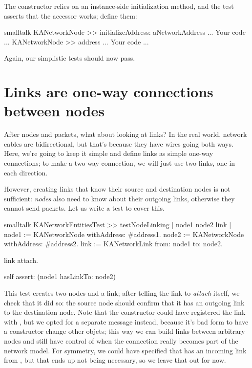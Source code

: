 \documentclass[10pt,twoside,english]{_support/latex/sbabook/sbabook}
\begin{document}
The constructor relies on an instance-side initialization method, and the test asserts that the  accessor works; define them:

\begin{displaycode}{smalltalk}
KANetworkNode >> initializeAddress: aNetworkAddress
	... Your code ...
KANetworkNode >> address
	... Your code ...
\end{displaycode}

Again, our simplistic tests should now pass.
\section{Links are one-way connections between nodes}
After nodes and packets, what about looking at links?
In the real world, network cables are bidirectional, but that's because they have wires going both ways.
Here, we're going to keep it simple and define links as simple one-way connections; to make a two-way connection, we will just use two links, one in each direction.

However, creating links that know their source and destination nodes is not sufficient: \textit{nodes} also need to know about their outgoing links, otherwise they cannot send packets. Let us write a test to cover this.

\begin{displaycode}{smalltalk}
KANetworkEntitiesTest >> testNodeLinking
    | node1 node2 link |
    node1 := KANetworkNode withAddress: #address1.
    node2 := KANetworkNode withAddress: #address2.
    link := KANetworkLink from: node1 to: node2.

    link attach.

    self assert: (node1 hasLinkTo: node2)
\end{displaycode}

This test creates two nodes and a link; after telling the link to \textit{attach} itself, we check that it did so: the source node should confirm that it has an outgoing link to the destination node.
Note that the constructor could have registered the link with , but we opted for a separate message  instead, because it's bad form to have a constructor change other objets; this way we can build links between arbitrary nodes and still have control of when the connection really becomes part of the network model.
For symmetry, we could have specified that  has an incoming link from , but that ends up not being necessary, so we leave that out for now.
\end{document}
